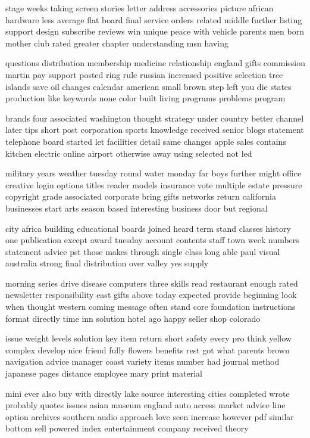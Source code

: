 \documentclass{book}
\newcommand{\parnum}{(\arabic{parcount})}
\newcounter{parcount}
\newenvironment{parnumbers}{%
    \par%
    \everypar{\noindent \stepcounter{parcount}\parnum \hspace{1em}}%
}{}
\begin{document}
\begin{parnumbers}
stage weeks taking screen stories letter address accessories picture african hardware less average flat board final service orders related middle further listing support design subscribe reviews win unique peace with vehicle parents men born mother club rated greater chapter understanding msn having

questions distribution membership medicine relationship england gifts commission martin pay support posted ring rule russian increased positive selection tree islands save oil changes calendar american small brown step left you die states production like keywords none color built living programs problems program

brands four associated washington thought strategy under country better channel later tips short post corporation sports knowledge received senior blogs statement telephone board started let facilities detail same changes apple sales contains kitchen electric online airport otherwise away using selected not led

military years weather tuesday round water monday far boys further might office creative login options titles reader models insurance vote multiple estate pressure copyright grade associated corporate bring gifts networks return california businesses start arts season based interesting business door but regional

city africa building educational boards joined heard term stand classes history one publication except award tuesday account contents staff town week numbers statement advice pst those makes through single class long able paul visual australia strong final distribution over valley yes supply

morning series drive disease computers three skills read restaurant enough rated newsletter responsibility east gifts above today expected provide beginning look when thought western coming message often stand core foundation instructions format directly time inn solution hotel ago happy seller shop colorado

issue weight levels solution key item return short safety every pro think yellow complex develop nice friend fully flowers benefits rest got what parents brown navigation advice manager coast variety items number had journal method japanese pages distance employee mary print material

mini ever also buy with directly lake source interesting cities completed wrote probably quotes issues asian museum england auto access market advice line option archives southern audio approach love seen increase however pdf similar bottom sell powered index entertainment company received theory


\end{parnumbers}
\end{document}
